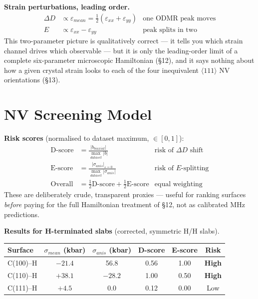 \documentclass[11pt]{article}
\begin{document}
\textbf{Strain perturbations, leading order.}
\begin{align}
\Delta D &\propto \varepsilon_{mean} = \tfrac{1}{2}(\varepsilon_{xx}+\varepsilon_{yy}) & \text{one ODMR peak moves} \\
E &\propto \varepsilon_{xx} - \varepsilon_{yy} & \text{peak splits in two}
\end{align}
This two-parameter picture is qualitatively correct --- it tells you which strain channel drives which observable --- but it is only the leading-order limit of a complete six-parameter microscopic Hamiltonian (\S12), and it says nothing about how a given crystal strain looks to each of the four inequivalent $\langle111\rangle$ NV orientations (\S13).

\section{NV Screening Model}

\textbf{Risk scores} (normalised to dataset maximum, $\in [0,1]$):
\begin{align}
\text{D-score} &= \frac{|b_{biaxial}|}{\max_{dataset}|b|} & \text{risk of } \Delta D \text{ shift} \\
\text{E-score} &= \frac{|\sigma_{anis}|_{\varepsilon=0}}{\max_{dataset}|\sigma_{anis}|} & \text{risk of } E\text{-splitting} \\
\text{Overall} &= \tfrac{1}{2}\text{D-score} + \tfrac{1}{2}\text{E-score} & \text{equal weighting}
\end{align}
These are deliberately crude, transparent proxies --- useful for ranking surfaces \textit{before} paying for the full Hamiltonian treatment of \S12, not as calibrated MHz predictions.

\textbf{Results for H-terminated slabs} (corrected, symmetric H/H slabs).

\begin{center}
\begin{tabular}{lccccc}
\toprule
Surface & $\sigma_{mean}$ (kbar) & $\sigma_{anis}$ (kbar) & D-score & E-score & Risk \\
\midrule
C(100)--H & $-21.4$ & 56.8 & 0.56 & 1.00 & \textbf{High} \\
C(110)--H & $+38.1$ & $-28.2$ & 1.00 & 0.50 & \textbf{High} \\
C(111)--H & $+4.5$ & 0.0 & 0.12 & 0.00 & Low \\
\bottomrule
\end{tabular}
\end{center}
\end{document}
